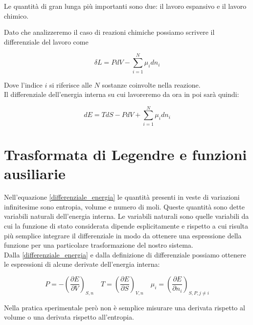 Le quantità di gran lunga più importanti sono due: il lavoro espansivo e il lavoro chimico. 

Dato che analizzeremo il caso di reazioni chimiche possiamo scrivere il differenziale del lavoro come 

\begin{equation}
    \delta L = P dV - \sum_{i = 1}^N \mu_i d n_i
\end{equation}

Dove l'indice $i$ si riferisce alle $N$ sostanze coinvolte nella reazione. \\

Il differenziale dell'energia interna su cui lavoreremo da ora in poi sarà quindi:

\begin{equation}
    dE = T dS - P dV + \sum_{i = 1}^N \mu_i d n_i
    \label{differenziale_energia}
\end{equation}

\section{Trasformata di Legendre e funzioni ausiliarie}

Nell'equazione \eqref{differenziale_energia} le quantità presenti in veste di variazioni infinitesime sono entropia, volume e numero di moli. 
Queste quantità sono dette variabili naturali dell’energia interna. Le variabili naturali sono quelle variabili da cui la funzione di stato considerata dipende esplicitamente e rispetto a cui risulta più semplice integrare il differenziale in modo da ottenere una espressione della funzione per una particolare trasformazione del nostro sistema.\\

Dalla \eqref{differenziale_energia} e dalla definizione di differenziale possiamo ottenere le espressioni di alcune derivate dell’energia interna:

\begin{equation}
    P = - \left( \frac{\partial E}{\partial V} \right)_{S,n} \quad T = \left( \frac{\partial E}{\partial S} \right)_{V,n} \quad \mu_i = \left( \frac{\partial E}{\partial n_i} \right)_{S,P,j \neq i}
\end{equation}

Nella pratica sperimentale però non è semplice misurare una derivata rispetto al volume o una derivata rispetto all’entropia. \\


